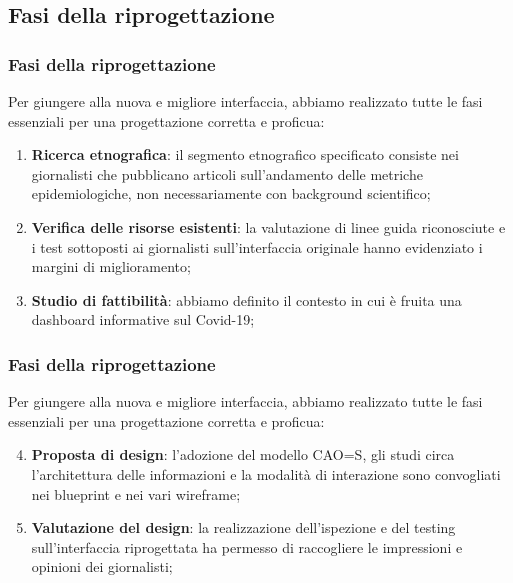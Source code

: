 
\subsection{Fasi della riprogettazione}

\begin{frame}
    \frametitle{Fasi della riprogettazione}
    Per giungere alla nuova e migliore interfaccia, abbiamo realizzato tutte le fasi essenziali per una progettazione corretta e proficua:
    \begin{enumerate}
        \item<1-> \textbf{Ricerca etnografica}: il segmento etnografico specificato consiste nei giornalisti che pubblicano articoli sull'andamento delle metriche epidemiologiche, non necessariamente con background scientifico;
        \item<2-> \textbf{Verifica delle risorse esistenti}: la valutazione di linee guida riconosciute e i test sottoposti ai giornalisti sull'interfaccia originale hanno evidenziato i margini di miglioramento;
        \item<3->  \textbf{Studio di fattibilità}: abbiamo definito il contesto in cui è fruita una dashboard informative sul Covid-19;
    \end{enumerate}  

\end{frame}

\begin{frame}
    \frametitle{Fasi della riprogettazione}
    Per giungere alla nuova e migliore interfaccia, abbiamo realizzato tutte le fasi essenziali per una progettazione corretta e proficua: 
    \begin{enumerate}
        \setcounter{enumi}{3}
        \item<1-> \textbf{Proposta di design}: l'adozione del modello CAO=S, gli studi circa l'architettura delle informazioni e la modalità di interazione sono convogliati nei blueprint e nei vari wireframe;
        \item<2-> \textbf{Valutazione del design}: la realizzazione dell'ispezione e del testing sull'interfaccia riprogettata ha permesso di raccogliere le impressioni e opinioni dei giornalisti;
    \end{enumerate}  

\end{frame}